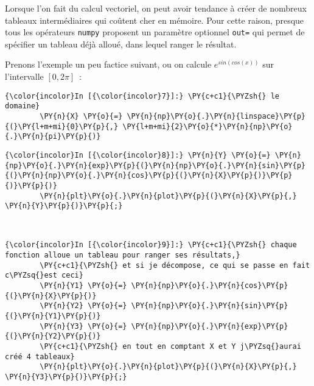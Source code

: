     Lorsque l'on fait du calcul vectoriel, on peut avoir tendance à créer de
nombreux tableaux intermédiaires qui coûtent cher en mémoire. Pour cette
raison, presque tous les opérateurs \texttt{numpy} proposent un
paramètre optionnel \texttt{out=} qui permet de spécifier un tableau
déjà alloué, dans lequel ranger le résultat.

    Prenons l'exemple un peu factice suivant, ou on calcule
\(e^{sin(cos(x))}\) sur l'intervalle \([0, 2\pi]\)~:

    \begin{Verbatim}[commandchars=\\\{\}]
{\color{incolor}In [{\color{incolor}7}]:} \PY{c+c1}{\PYZsh{} le domaine}
        \PY{n}{X} \PY{o}{=} \PY{n}{np}\PY{o}{.}\PY{n}{linspace}\PY{p}{(}\PY{l+m+mi}{0}\PY{p}{,} \PY{l+m+mi}{2}\PY{o}{*}\PY{n}{np}\PY{o}{.}\PY{n}{pi}\PY{p}{)}
\end{Verbatim}


    \begin{Verbatim}[commandchars=\\\{\}]
{\color{incolor}In [{\color{incolor}8}]:} \PY{n}{Y} \PY{o}{=} \PY{n}{np}\PY{o}{.}\PY{n}{exp}\PY{p}{(}\PY{n}{np}\PY{o}{.}\PY{n}{sin}\PY{p}{(}\PY{n}{np}\PY{o}{.}\PY{n}{cos}\PY{p}{(}\PY{n}{X}\PY{p}{)}\PY{p}{)}\PY{p}{)}
        \PY{n}{plt}\PY{o}{.}\PY{n}{plot}\PY{p}{(}\PY{n}{X}\PY{p}{,} \PY{n}{Y}\PY{p}{)}\PY{p}{;}
\end{Verbatim}


    \begin{center}
    \end{center}
    { \hspace*{\fill} \\}
    
    \begin{Verbatim}[commandchars=\\\{\}]
{\color{incolor}In [{\color{incolor}9}]:} \PY{c+c1}{\PYZsh{} chaque fonction alloue un tableau pour ranger ses résultats,}
        \PY{c+c1}{\PYZsh{} et si je décompose, ce qui se passe en fait c\PYZsq{}est ceci}
        \PY{n}{Y1} \PY{o}{=} \PY{n}{np}\PY{o}{.}\PY{n}{cos}\PY{p}{(}\PY{n}{X}\PY{p}{)}
        \PY{n}{Y2} \PY{o}{=} \PY{n}{np}\PY{o}{.}\PY{n}{sin}\PY{p}{(}\PY{n}{Y1}\PY{p}{)}
        \PY{n}{Y3} \PY{o}{=} \PY{n}{np}\PY{o}{.}\PY{n}{exp}\PY{p}{(}\PY{n}{Y2}\PY{p}{)}
        \PY{c+c1}{\PYZsh{} en tout en comptant X et Y j\PYZsq{}aurai créé 4 tableaux}
        \PY{n}{plt}\PY{o}{.}\PY{n}{plot}\PY{p}{(}\PY{n}{X}\PY{p}{,} \PY{n}{Y3}\PY{p}{)}\PY{p}{;}
\end{Verbatim}


